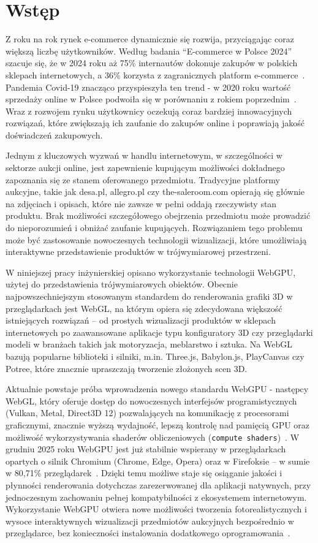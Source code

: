 \section{Wstęp}
Z roku na rok rynek e-commerce dynamicznie się rozwija, przyciągając coraz większą liczbę użytkowników. Według badania \enquote{E-commerce w Polsce 2024} szacuje się, że w 2024 roku aż 75\% internautów dokonuje zakupów w polskich sklepach internetowych, a 36\% korzysta z zagranicznych platform e-commerce~\cite{gemius2024}. Pandemia Covid-19 znacząco przyspieszyła ten trend - w 2020 roku wartość sprzedaży online w Polsce podwoiła się w porównaniu z rokiem poprzednim~\cite{gemius2024}. Wraz z rozwojem rynku użytkownicy oczekują coraz bardziej innowacyjnych rozwiązań, które zwiększają ich zaufanie do zakupów online i poprawiają jakość doświadczeń zakupowych.

Jednym z kluczowych wyzwań w handlu internetowym, w szczególności w sektorze aukcji online, jest zapewnienie kupującym możliwości dokładnego zapoznania się ze stanem oferowanego przedmiotu. Tradycyjne platformy aukcyjne, takie jak desa.pl, allegro.pl czy the-saleroom.com opierają się głównie na zdjęciach i opisach, które nie zawsze w pełni oddają rzeczywisty stan produktu. Brak możliwości szczegółowego obejrzenia przedmiotu może prowadzić do nieporozumień i obniżać zaufanie kupujących. Rozwiązaniem tego problemu może być zastosowanie nowoczesnych technologii wizualizacji, które umożliwiają interaktywne przedstawienie produktów w trójwymiarowej przestrzeni.

W niniejszej pracy inżynierskiej opisano wykorzystanie technologii WebGPU, użytej do przedstawienia trójwymiarowych obiektów. Obecnie najpowszechniejszym stosowanym standardem do renderowania grafiki 3D w przeglądarkach jest WebGL, na którym opiera się zdecydowana większość istniejących rozwiązań – od prostych wizualizacji produktów w sklepach internetowych po zaawansowane aplikacje typu konfiguratory 3D czy przeglądarki modeli w branżach takich jak motoryzacja, meblarstwo i sztuka. Na WebGL bazują popularne biblioteki i silniki, m.in. Three.js, Babylon.js, PlayCanvas czy Potree, które znacznie upraszczają tworzenie złożonych scen 3D.

Aktualnie powstaje próba wprowadzenia nowego standardu WebGPU - następcy WebGL, który oferuje dostęp do nowoczesnych interfejsów programistycznych (Vulkan, Metal, Direct3D 12) pozwalających na komunikację z procesorami graficznymi, znacznie wyższą wydajność, lepszą kontrolę nad pamięcią GPU oraz możliwość wykorzystywania shaderów obliczeniowych (\texttt{compute shaders})~\cite{isprs-archives-XLVIII-4-W9-2024-377-2024}. W grudniu 2025 roku WebGPU jest już stabilnie wspierany w przeglądarkach opartych o silnik Chromium (Chrome, Edge, Opera) oraz w Firefoksie -- w sumie w 80,71\% przeglądarek~\cite{caniuse-webgpu}. Dzięki temu możliwe staje się osiąganie jakości i płynności renderowania dotychczas zarezerwowanej dla aplikacji natywnych, przy jednoczesnym zachowaniu pełnej kompatybilności z ekosystemem internetowym. Wykorzystanie WebGPU otwiera nowe możliwości tworzenia fotorealistycznych i wysoce interaktywnych wizualizacji przedmiotów aukcyjnych bezpośrednio w przeglądarce, bez konieczności instalowania dodatkowego oprogramowania~\cite{dang2024}.
\newpage

